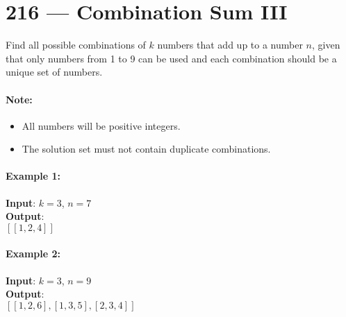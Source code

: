 \section{216 --- Combination Sum III}
Find all possible combinations of $k$ numbers that add up to a number $n$, given that only numbers from 1 to 9 can be used and each combination should be a unique set of numbers.
\paragraph{Note:}
\begin{itemize}
\item All numbers will be positive integers.
\item The solution set must not contain duplicate combinations.
\end{itemize}
\paragraph{Example 1:}
\begin{flushleft}
\textbf{Input}: $k = 3$, $n = 7$
\\
\textbf{Output}: 
\\
$[[1,2,4]]$
\end{flushleft}
\paragraph{Example 2:}
\begin{flushleft}
\textbf{Input}: $k = 3$, $n = 9$
\\
\textbf{Output}: 
\\
$[[1,2,6], [1,3,5], [2,3,4]]$
\end{flushleft}
